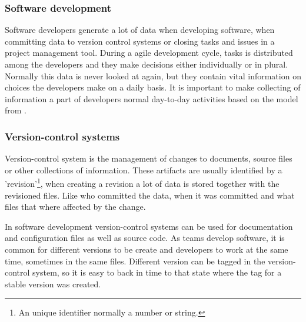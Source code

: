 \subsubsection{Software development}
Software developers generate a lot of data when developing software, when committing data to version control systems or closing tasks and issues in a project management tool. During a agile development cycle, tasks is distributed among the developers and they make decisions either individually or in plural. Normally this data is never looked at again, but they contain vital information on choices the developers make on a daily basis. It is important to make collecting of information a part of developers normal day-to-day activities based on the model from \citep{Krogstie2009}.

\subsubsection{Version-control systems}
Version-control system is the management of changes to documents, source files or other collections of information. These artifacts are usually identified by a 'revision'\footnote{An unique identifier normally a number or string.}, when creating a revision a lot of data is stored together with the revisioned files. Like who committed the data, when it was committed and what files that where affected by the change.

In software development version-control systems can be used for documentation and configuration files as well as source code. As teams develop software, it is common for different versions to be create and developers to work at the same time, sometimes in the same files. Different version can be tagged in the version-control system, so it is easy to back in time to that state where the tag for a stable version was created.



